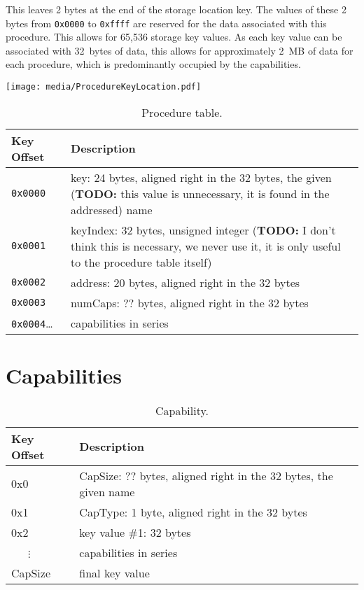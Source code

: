 \documentclass[english,a4paper]{article}
\begin{document}
This leaves 2 bytes at the end of the storage location key. The values of these
2 bytes from \texttt{0x0000} to \texttt{0xffff} are reserved for the data
associated with this procedure. This allows for 65,536 storage key values. As
each key value can be associated with 32~bytes of data, this allows for
approximately 2~MB of data for each procedure, which is predominantly occupied
by the capabilities.

\texttt{[image: media/ProcedureKeyLocation.pdf]}

\begin{table}[H]
  \caption{Procedure table.}
  \centering{}%
  \begin{tabular}{l|p{}}
    \hline
    Key Offset & Description\tabularnewline
    \hline
    \hline
    \texttt{0x0000}       & key: 24 bytes, aligned right in the 32 bytes, the
      given (\textbf{TODO:} this value is unnecessary, it is found in the
      addressed) name \tabularnewline
    \texttt{0x0001}       & keyIndex: 32 bytes, unsigned integer (\textbf{TODO:}
      I don't think this is necessary, we never use it, it is only useful to the
      procedure table itself)
      \tabularnewline
    \texttt{0x0002}       & address: 20 bytes, aligned right in the 32 bytes
      \tabularnewline
    \texttt{0x0003}       & numCaps: ?? bytes, aligned right in the 32 bytes
      \tabularnewline
    \texttt{0x0004}\ldots & capabilities in series \tabularnewline
    \hline
  \end{tabular}
\end{table}

\section{Capabilities}\label{capabilities}
\begin{table}[H]
  \caption{Capability.}
  \centering{}%
  \begin{tabular}{l|p{}}
    \hline
    Key Offset & Description\tabularnewline
    \hline
    \hline
    0x0       & CapSize: ?? bytes, aligned right in the 32 bytes, the given
      name \tabularnewline
    0x1       & CapType: 1 byte, aligned right in the 32 bytes \tabularnewline
    0x2       & key value \#1: 32 bytes \tabularnewline
    ~~~$\vdots$ & capabilities in series \tabularnewline
    CapSize & final key value \tabularnewline
    \hline
  \end{tabular}
\end{table}
\end{document}
